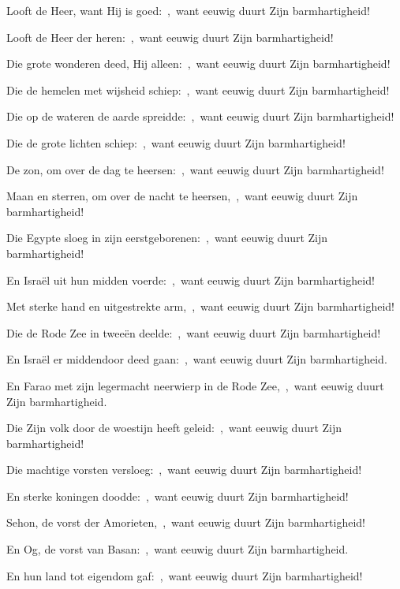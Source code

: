 \documentclass[12pt,twoside,a5paper]{article}
\begin{document}
\begin{halfparskip}
   Looft de Heer, want Hij is goed:~\sep\ want eeuwig duurt Zijn barmhartigheid!


  Looft de Heer der heren:~\sep\ want eeuwig duurt Zijn barmhartigheid!

  Die grote wonderen deed, Hij alleen:~\sep\ want eeuwig duurt Zijn barmhartigheid!

  Die de hemelen met wijsheid schiep:~\sep\ want eeuwig duurt Zijn barmhartigheid!

  Die op de wateren de aarde spreidde:~\sep\ want eeuwig duurt Zijn barmhartigheid!

  Die de grote lichten schiep:~\sep\ want eeuwig duurt Zijn barmhartigheid!

  De zon, om over de dag te heersen:~\sep\ want eeuwig duurt Zijn barmhartigheid!

  Maan en sterren, om over de nacht te heersen,~\sep\ want eeuwig duurt Zijn barmhartigheid!

  Die Egypte sloeg in zijn eerstgeborenen:~\sep\ want eeuwig duurt Zijn barmhartigheid!

  En Israël uit hun midden voerde:~\sep\ want eeuwig duurt Zijn barmhartigheid!

  Met sterke hand en uitgestrekte arm,~\sep\ want eeuwig duurt Zijn barmhartigheid!

  Die de Rode Zee in tweeën deelde:~\sep\ want eeuwig duurt Zijn barmhartigheid!

  En Israël er middendoor deed gaan:~\sep\ want eeuwig duurt Zijn barmhartigheid.

  En Farao met zijn legermacht neerwierp in de Rode Zee,~\sep\ want eeuwig duurt Zijn barmhartigheid.

  Die Zijn volk door de woestijn heeft geleid:~\sep\ want eeuwig duurt Zijn barmhartigheid!

  Die machtige vorsten versloeg:~\sep\ want eeuwig duurt Zijn barmhartigheid!

  En sterke koningen doodde:~\sep\ want eeuwig duurt Zijn barmhartigheid!

  Sehon, de vorst der Amorieten,~\sep\ want eeuwig duurt Zijn barmhartigheid!

  En Og, de vorst van Basan:~\sep\ want eeuwig duurt Zijn barmhartigheid.

  En hun land tot eigendom gaf:~\sep\ want eeuwig duurt Zijn barmhartigheid!


\end{halfparskip}
\end{document}
